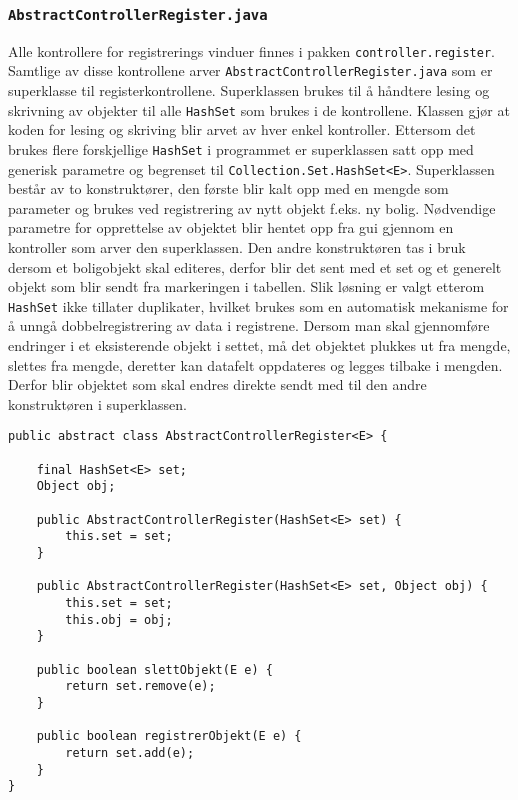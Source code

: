\subsubsection*{\texttt{AbstractControllerRegister.java}}
Alle kontrollere for registrerings vinduer finnes i pakken \texttt{controller.register}. Samtlige av disse kontrollene arver \texttt{AbstractControllerRegister.java} som er superklasse til registerkontrollene. Superklassen brukes til å håndtere lesing og skrivning av objekter til alle \texttt{HashSet} som brukes i de kontrollene. Klassen gjør at koden for lesing og skriving blir arvet av hver enkel kontroller. Ettersom det brukes flere forskjellige \texttt{HashSet} i programmet er superklassen satt opp med generisk parametre og begrenset til \texttt{Collection.Set.HashSet<E>}. Superklassen består av to konstruktører, den første blir kalt opp med en mengde som parameter og brukes ved registrering av nytt objekt f.eks. ny bolig. Nødvendige parametre for opprettelse av objektet blir hentet opp fra gui gjennom en kontroller som arver den superklassen. Den andre konstruktøren tas i bruk dersom et boligobjekt skal editeres, derfor blir det sent med et set og et generelt objekt som blir sendt fra markeringen i tabellen. Slik løsning er valgt etterom \texttt{HashSet} ikke tillater duplikater, hvilket brukes som en automatisk mekanisme for å unngå dobbelregistrering av data i registrene. Dersom man skal gjennomføre endringer i et eksisterende objekt i settet, må det objektet plukkes ut fra mengde, slettes fra mengde, deretter kan datafelt oppdateres og legges tilbake i mengden. Derfor blir objektet som skal endres direkte sendt med til den andre konstruktøren i superklassen.


\begin{lstlisting}[caption=\texttt{AbstractControllerRegister.java} kontroller arvet av alle regsitreringskontrollerene.,label=kode:contreg1]
public abstract class AbstractControllerRegister<E> {

    final HashSet<E> set;
    Object obj;

    public AbstractControllerRegister(HashSet<E> set) {
        this.set = set;
    }

    public AbstractControllerRegister(HashSet<E> set, Object obj) {
        this.set = set;
        this.obj = obj;
    }

    public boolean slettObjekt(E e) {
        return set.remove(e);
    }
    
    public boolean registrerObjekt(E e) {
        return set.add(e);
    }
}

\end{lstlisting}



